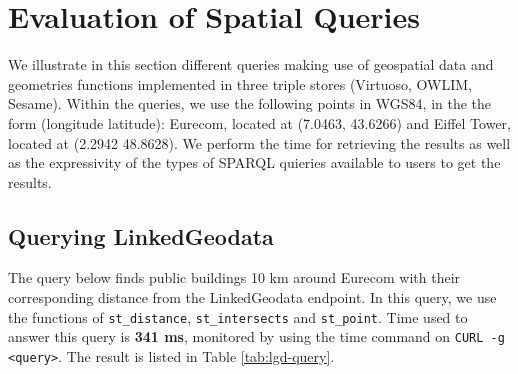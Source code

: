 \begin{table}[!htbp]
\end{table}

\section{Evaluation of Spatial Queries}
\label{sec:geoqueries}

We illustrate in this section different queries making use of geospatial data and geometries functions implemented in three triple stores (Virtuoso, OWLIM, Sesame). Within the queries, we use the following points in WGS84, in the the form (longitude latitude): Eurecom, located at (7.0463, 43.6266) and Eiffel Tower, located at (2.2942 48.8628). We perform the time for retrieving the results as well as the expressivity of the types of SPARQL quieries available to users to get the results.

\subsection{Querying LinkedGeodata}
\label{sec:linkedgeodata}
The query below finds public buildings 10 km around Eurecom with their corresponding distance from the LinkedGeodata endpoint. In this query, we use the functions of \texttt{st\_distance}, \texttt{st\_intersects} and \texttt{st\_point}. Time used to answer this query is \textbf{341 ms}, monitored by using the time command on \texttt{CURL -g <query>}. The result is listed in Table \ref{tab:lgd-query}.

